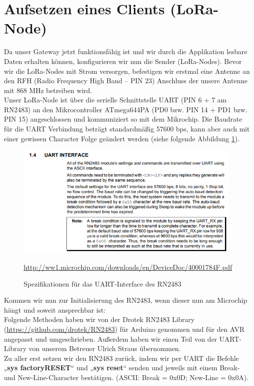 \section{Aufsetzen eines Clients (LoRa-Node)} \label{mac-commands}
Da unser Gateway jetzt funktionsfähig ist und wir durch die Applikation lesbare Daten erhalten können, konfigurieren wir nun die Sender (LoRa-Nodes).
Bevor wir die LoRa-Nodes mit Strom versorgen, befestigen wir erstmal eine Antenne an den RFH (Radio Frequency High Band – PIN 23) Anschluss der unsere Antenne mit 868 MHz betreiben wird.\\
Unser LoRa-Node ist über die serielle Schnittstelle UART (PIN 6 + 7 am RN2483) an den Mikrocontroller ATmega644PA (PD0 bzw. PIN 14 + PD1 bzw. PIN 15) angeschlossen und kommuniziert so mit dem Mikrochip. Die Baudrate für die UART Verbindung beträgt standardmäßig 57600 bps, kann aber auch mit einer gewissen Character Folge geändert werden (siehe folgende Abbildung \ref{fig:UART}).
\begin{figure}[H]
    \center
    \includegraphics[width=11cm]{Bilder/lora-8.png}\\
    \caption{Spezifikationen für das UART-Interface des RN2483}
    \begin{center} \quelle\url{http://ww1.microchip.com/downloads/en/DeviceDoc/40001784F.pdf} \end{center}
        \label{fig:UART}
\end{figure}
\noindent
Kommen wir nun zur Initialisierung des RN2483, wenn dieser nun am Microchip hängt und soweit ansprechbar ist:\\

\noindent
Folgende Methoden haben wir von der Drotek RN2483 Library (\url{https://github.com/drotek/RN2483}) für Arduino genommen und für den AVR angepasst und umgeschrieben. Außerdem haben wir einen Teil von der UART-Library von unserem Betreuer Ulrich Straus übernommen.\\

\noindent
Zu aller erst setzen wir den RN2483 zurück, indem wir per UART die Befehle „\textbf{sys factoryRESET}“ und „\textbf{sys reset}“ senden und jeweils mit einem Break- und New-Line-Character bestätigen. (ASCII: Break = 0x0D; New-Line = 0x0A).\\

